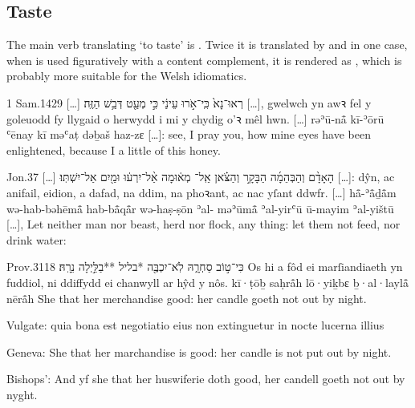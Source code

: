 \subsection{Taste}


\begin{paper}
	The main verb translating  ‘to taste’ is . Twice it is translated by  and in one case, when  is used figuratively with a content complement, it is rendered as , which is probably more suitable for the Welsh idiomatics.
\end{paper}

\begin{example}{1 Sam.}{14}{29}{}{}
	\quoling
	{[…] רְאוּ־נָא֙ כִּֽי־אֹ֣רוּ עֵינַ֔י כִּ֣י  מְעַ֖ט דְּבַ֥שׁ הַזֶּֽה׃}
	{[…], gwelwch yn awꝛ fel y goleuodd fy llygaid o herwydd i mi  y chydig o’ꝛ mêl hwn.}
	{[…] rəʾū-nå̄ kī-ʾōrū ʿēnay kī  məʿaṭ dəḇaš haz-zɛ}
	{[…]: see, I pray you, how mine eyes have been enlightened, because I  a little of this honey.}
\end{example}

\begin{example}{Jon.}{3}{7}{}{}
	\quoling
	{[…] הָאָדָ֨ם וְהַבְּהֵמָ֜ה הַבָּקָ֣ר וְהַצֹּ֗אן אַֽל־ מְא֔וּמָה אַ֨ל־יִרְע֔וּ וּמַ֖יִם אַל־יִשְׁתּֽוּ׃}
	{[…]: dŷn, ac anifail, eidion, a dafad, na  ddim, na phoꝛant, ac nac yſant ddwfr.}
	{[…] hå̄-ʾå̄ḏå̄m wə-hab-bəhēmå̄ hab-bå̄qå̄r wə-haṣ-ṣōn ʾal- məʾūmå̄ ʾal-yirʿū ū-mayim ʾal-yištū}
	{[…], Let neither man nor beast, herd nor flock,  any thing: let them not feed, nor drink water:}
\end{example}

\begin{example}{Prov.}{31}{18}{}{}
	\quoling
	{ כִּי־ט֣וֹב סַחְרָ֑הּ לֹֽא־יִכְבֶּ֖ה *בליל **בַלַּ֣יְלָה נֵרָֽהּ׃}
	{Os hi a  fôd ei marſiandiaeth yn fuddiol, ni ddiffydd ei chanwyll ar hŷd y nôs.}
	{ kī·ṭōḇ saḥrå̄h lō·yiḵbɛ ḇ·al·laylå̄ nērå̄h}
	{She  that her merchandise  good: her candle goeth not out by night.}
\end{example}
\begin{compactdesc}\small
	\item [Vulgate:]  quia bona est negotiatio eius non extinguetur in nocte lucerna illius
	\item [Geneva:] She  that her marchandise is good: her candle is not put out by night.
	\item [Bishops’:] And yf she  that her huswiferie doth good, her candell goeth not out by nyght.
\end{compactdesc}



